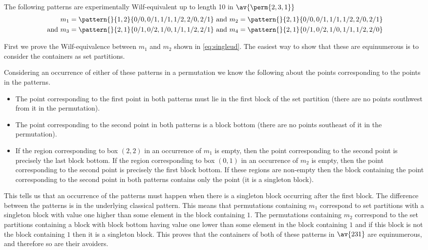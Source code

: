 \subsection{}
\nextvar
The following patterns are experimentally Wilf-equivalent up to length 10 in
\(\av{\perm{2,3,1}}\)
\begin{align}
    m_1 = \pattern{}{1,2}{0/0,0/1,1/1,1/2,2/0,2/1} &\text{ and }
    m_2 = \pattern{}{2,1}{0/0,0/1,1/1,1/2,2/0,2/1} \label{eq:singleud}\\
    \text{ and }
    m_3 = \pattern{}{2,1}{0/1,0/2,1/0,1/1,1/2,2/1} &\text{ and }
    m_4 = \pattern{}{2,1}{0/1,0/2,1/0,1/1,1/2,2/0} \label{eq:other}
\end{align}

First we prove the Wilf-equivalence between \(m_1\) and \(m_2\) shown in
\eqref{eq:singleud}. The easiest way to
show that these are equinumerous is to consider the containers as set partitions.

Considering an occurrence of either of these patterns in a permutation  we know
the following about the points corresponding to the points in the patterns.
\begin{itemize}
    \item The point corresponding to the first point in both patterns
        must lie in the first block of the set partition (there are
        no points southwest from it in the permutation).
    \item The point corresponding to the second point in both patterns
        is a block bottom (there are no points southeast of it in
        the permutation).
    \item If the region corresponding to box \((2,2)\) in an occurrence of
    \(m_1\) is empty, then the point corresponding to the second point is
    precisely the last block bottom. If the region corresponding to box \((0,1)\)
    in an occurrence of \(m_2\) is empty, then the point corresponding to the
    second point is precisely the first block bottom.
    If these regions are non-empty then the block containing the point
    corresponding to the second point in both patterns contains only the point
    (it is a singleton block).
\end{itemize}
This tells us that an occurrence of the patterns must happen when there
is a singleton block occurring after the first block. The difference
between the patterns is in the underlying classical pattern. This
means that permutations containing \(m_1\) correspond to set partitions
with a singleton block with value one higher than some element in the
block containing \(1\). The permutations containing \(m_2\) correspond
to the set partitions containing a block with block bottom having value
one lower than some element in the block containing \(1\) and if this
block is not the block containing \(1\) then it is a singleton block. This
proves that the containers of both of these patterns in \(\av{231}\) are
equinumerous, and therefore so are their avoiders.

